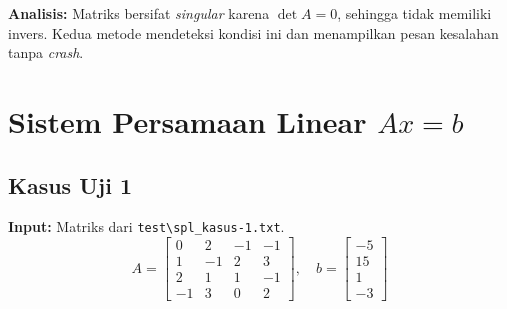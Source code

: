 \documentclass[12pt,a4paper]{report}
\begin{document}
\textbf{Analisis:} Matriks bersifat \emph{singular} karena $\det A = 0$, sehingga tidak memiliki invers. Kedua metode mendeteksi kondisi ini dan menampilkan pesan kesalahan tanpa \emph{crash}. 

\section{Sistem Persamaan Linear $Ax = b$}
 
\subsection{Kasus Uji 1}
\textbf{Input:} Matriks dari \texttt{test\textbackslash spl\_kasus-1.txt}.
\[
A = \begin{bmatrix} 0 & 2 & -1 & -1 \\ 1 & -1 & 2 & 3 \\ 2 & 1 & 1 & -1 \\ -1 & 3 & 0 & 2 \end{bmatrix},
\quad
b = \begin{bmatrix} -5 \\ 15 \\ 1 \\ -3 \end{bmatrix}
\]
 
\end{document}
